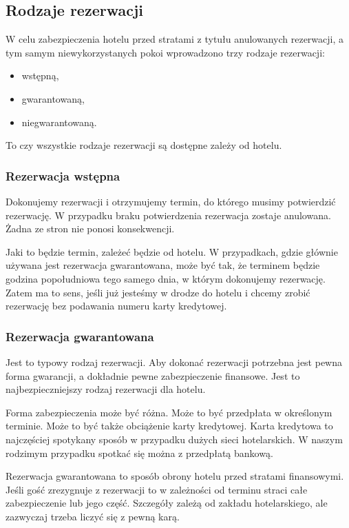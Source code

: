 \documentclass[a4paper,onecolumn,oneside,11pt,wide,floatssmall]{mwrep}
\theoremstyle{definition}
\theoremstyle{plain}%
\theoremstyle{remark}
\begin{document}
\subsection{Rodzaje rezerwacji}
W celu zabezpieczenia hotelu przed stratami z tytułu anulowanych rezerwacji, 
a tym samym niewykorzystanych pokoi wprowadzono trzy rodzaje rezerwacji:

\begin{itemize}
  \item wstępną,
  \item gwarantowaną,
  \item niegwarantowaną.
\end{itemize}

To czy wszystkie rodzaje rezerwacji są dostępne zależy od hotelu. 

\subsubsection{Rezerwacja wstępna}
Dokonujemy rezerwacji i otrzymujemy termin, do którego musimy potwierdzić 
rezerwację. W przypadku braku potwierdzenia rezerwacja zostaje anulowana. 
Żadna ze stron nie ponosi konsekwencji.

Jaki to będzie termin, zależeć będzie od hotelu. W przypadkach, gdzie 
głównie używana jest rezerwacja gwarantowana, może być tak, że terminem 
będzie godzina popołudniowa tego samego dnia, w którym dokonujemy rezerwację.
 Zatem ma to sens, jeśli już jesteśmy w drodze do hotelu i chcemy zrobić 
 rezerwację bez podawania numeru karty kredytowej.

\subsubsection{Rezerwacja gwarantowana}
Jest to typowy rodzaj rezerwacji. Aby dokonać rezerwacji potrzebna jest 
pewna forma gwarancji, a dokładnie pewne zabezpieczenie finansowe. Jest to 
najbezpieczniejszy rodzaj rezerwacji dla hotelu.

Forma zabezpieczenia może być różna. Może to być przedpłata w określonym 
terminie. Może to być także obciążenie karty kredytowej. Karta kredytowa to 
najczęściej spotykany sposób w przypadku dużych sieci hotelarskich. W naszym 
rodzimym przypadku spotkać się można z przedpłatą bankową.

Rezerwacja gwarantowana to sposób obrony hotelu przed stratami finansowymi. 
Jeśli gość zrezygnuje z rezerwacji to w zależności od terminu straci 
całe zabezpieczenie lub jego część. Szczegóły zależą od zakładu hotelarskiego, 
ale zazwyczaj trzeba liczyć się z pewną karą.
\end{document}
